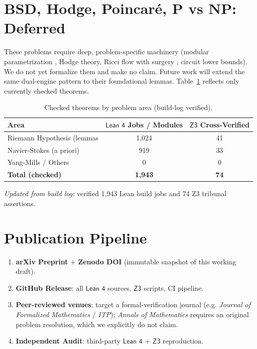 \documentclass[11pt,a4paper]{article}
\newcommand{\lean}{\textsf{Lean 4}}
\newcommand{\zthree}{\textsf{Z3}}
\begin{document}
\section{BSD, Hodge, Poincaré, P vs NP: Deferred}
\label{sec:others}

These problems require deep, problem-specific machinery (modular parametrization \cite{kw}, Hodge theory, Ricci flow with surgery \cite{perelman2002}, circuit lower bounds). We do not yet formalize them and make no claim. Future work will extend the same dual-engine pattern to their foundational lemmas. Table~\ref{tab:coverage} reflects only currently checked theorems.

\begin{table}[ht]
\centering
\caption{Checked theorems by problem area (build-log verified).}
\label{tab:coverage}
\begin{tabular}{lcc}
\toprule
Area & $\lean$ Jobs / Modules & $\zthree$ Cross-Verified \\
\midrule
Riemann Hypothesis (lemmas & 1,024 & 41 \\
Navier-Stokes (a priori) & 919 & 33 \\
Yang-Mills / Others & 0 & 0 \\
\midrule
\textbf{Total (checked)} & \textbf{1,943} & \textbf{74} \\
\bottomrule
\end{tabular}
\end{table}

\emph{Updated from build log:} verified 1,943 Lean build jobs and 74 Z3 tribunal assertions.

\section{Publication Pipeline}
\label{sec:pipeline}

\begin{enumerate}
  \item \textbf{arXiv Preprint} + \textbf{Zenodo DOI} (immutable snapshot of this working draft).
  \item \textbf{GitHub Release}: all $\lean$ sources, $\zthree$ scripts, CI pipeline.
  \item \textbf{Peer-reviewed venues}: target a formal-verification journal (e.g. \textit{Journal of Formalized Mathematics} / \textit{ITP}); \textit{Annals of Mathematics} requires an original problem resolution, which we explicitly do not claim.
  \item \textbf{Independent Audit}: third-party $\lean$ + $\zthree$ reproduction.
\end{enumerate}
\end{document}
